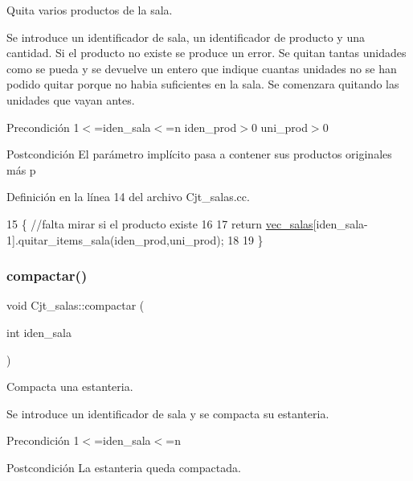 Quita varios productos de la sala. 

Se introduce un identificador de sala, un identificador de producto y una cantidad. Si el producto no existe se produce un error. Se quitan tantas unidades como se pueda y se devuelve un entero que indique cuantas unidades no se han podido quitar porque no habia suficientes en la sala. Se comenzara quitando las unidades que vayan antes. \begin{DoxyPrecond}{Precondición}
1$<$=iden\+\_\+sala$<$=n iden\+\_\+prod$>$0 uni\+\_\+prod$>$0 
\end{DoxyPrecond}
\begin{DoxyPostcond}{Postcondición}
El parámetro implícito pasa a contener sus productos originales más p 
\end{DoxyPostcond}


Definición en la línea 14 del archivo Cjt\+\_\+salas.\+cc.


\begin{DoxyCode}
15 \{ \textcolor{comment}{//falta mirar si el producto existe}
16 
17   \textcolor{keywordflow}{return} \hyperlink{class_cjt__salas_a3f130cc8bab35f449de8be69283af09e}{vec\_salas}[iden\_sala-1].quitar\_items\_sala(iden\_prod,uni\_prod);
18   
19 \}
\end{DoxyCode}
\mbox{\label{class_cjt__salas_a1ecd0e8e0ae84290c354447e2a305e80}} 
\subsubsection{\texorpdfstring{compactar()}{compactar()}}
{\footnotesize\ttfamily void Cjt\+\_\+salas\+::compactar (\begin{DoxyParamCaption}\item[{int}]{iden\+\_\+sala }\end{DoxyParamCaption})}



Compacta una estanteria. 

Se introduce un identificador de sala y se compacta su estanteria. \begin{DoxyPrecond}{Precondición}
1$<$=iden\+\_\+sala$<$=n 
\end{DoxyPrecond}
\begin{DoxyPostcond}{Postcondición}
La estanteria queda compactada. 
\end{DoxyPostcond}


